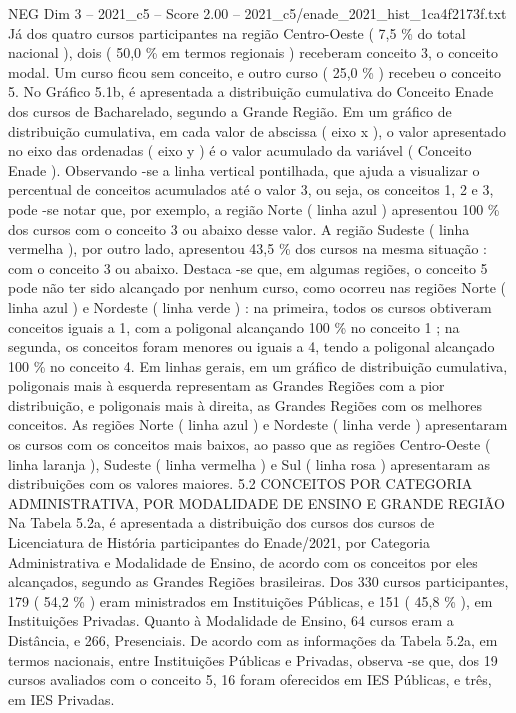\begin{textsample}{NEG Dim 3 – 2021\_c5 – Score 2.00 – 2021\_c5/enade\_2021\_hist\_1ca4f2173f.txt}
Já dos quatro cursos participantes na região Centro-Oeste ( 7,5 \% do total nacional ), dois ( 50,0 \% em termos regionais ) receberam conceito 3, o conceito modal.
Um curso ficou sem conceito, e outro curso ( 25,0 \% ) recebeu o conceito 5.
No Gráfico 5.1b, é apresentada a distribuição cumulativa do Conceito Enade dos cursos de Bacharelado, segundo a Grande Região.
Em um gráfico de distribuição cumulativa, em cada valor de abscissa ( eixo x ), o valor apresentado no eixo das ordenadas ( eixo y ) é o valor acumulado da variável ( Conceito Enade ).
Observando -se a linha vertical pontilhada, que ajuda a visualizar o percentual de conceitos acumulados até o valor 3, ou seja, os conceitos 1, 2 e 3, pode -se notar que, por exemplo, a região Norte ( linha azul ) apresentou 100 \% dos cursos com o conceito 3 ou abaixo desse valor.
A região Sudeste ( linha vermelha ), por outro lado, apresentou 43,5 \% dos cursos na mesma situação : com o conceito 3 ou abaixo.
Destaca -se que, em algumas regiões, o conceito 5 pode não ter sido alcançado por nenhum curso, como ocorreu nas regiões Norte ( linha azul ) e Nordeste ( linha verde ) : na primeira, todos os cursos obtiveram conceitos iguais a 1, com a poligonal alcançando 100 \% no conceito 1 ; na segunda, os conceitos foram menores ou iguais a 4, tendo a poligonal alcançado 100 \% no conceito 4.
Em linhas gerais, em um gráfico de distribuição cumulativa, poligonais mais à esquerda representam as Grandes Regiões com a pior distribuição, e poligonais mais à direita, as Grandes Regiões com os melhores conceitos.
As regiões Norte ( linha azul ) e Nordeste ( linha verde ) apresentaram os cursos com os conceitos mais baixos, ao passo que as regiões Centro-Oeste ( linha laranja ), Sudeste ( linha vermelha ) e Sul ( linha rosa ) apresentaram as distribuições com os valores maiores. 5.2 CONCEITOS POR CATEGORIA ADMINISTRATIVA, POR MODALIDADE DE ENSINO E GRANDE REGIÃO Na Tabela 5.2a, é apresentada a distribuição dos cursos dos cursos de Licenciatura de História participantes do Enade/2021, por Categoria Administrativa e Modalidade de Ensino, de acordo com os conceitos por eles alcançados, segundo as Grandes Regiões brasileiras.
Dos 330 cursos participantes, 179 ( 54,2 \% ) eram ministrados em Instituições Públicas, e 151 ( 45,8 \% ), em Instituições Privadas.
Quanto à Modalidade de Ensino, 64 cursos eram a Distância, e 266, Presenciais.
De acordo com as informações da Tabela 5.2a, em termos nacionais, entre Instituições Públicas e Privadas, observa -se que, dos 19 cursos avaliados com o conceito 5, 16 foram oferecidos em IES Públicas, e três, em IES Privadas.

\end{textsample}
